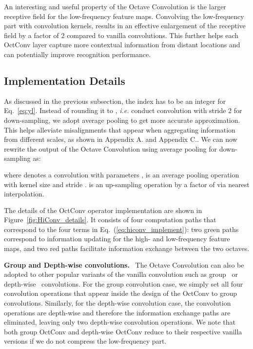\documentclass[10pt,twocolumn,letterpaper]{article}
\newcommand{\hiConv}[0]{OctConv\xspace}
\newcommand{\hiConvName}[0]{Octave Convolution\xspace}
\newcommand{\myparagraph}[1]{\vspace{1pt}\noindent\textbf{#1.}~}
\begin{document}
An interesting and useful property of the \hiConvName is the larger receptive field for the low-frequency feature maps. Convolving the low-frequency part  with  convolution kernels, results in an effective enlargement of the receptive field by a factor of 2 compared to vanilla convolutions. This further helps each \hiConv layer capture more contextual information from distant locations and can potentially improve recognition performance.


 

\subsection{Implementation Details}
\label{sec:implementation}


As discussed in the previous subsection, the index  has to be an integer for Eq.~\ref{eq:yl}. Instead of rounding it to , \emph{i.e.} conduct convolution with stride 2 for down-sampling, we adopt average pooling to get more accurate approximation. This helps alleviate misalignments that appear when aggregating information from different scales, as shown in Appendix A. and Appendix C.. We can now rewrite the output  of the \hiConvName using average pooling for down-sampling as:

where  denotes a convolution with parameters ,  is an average pooling operation with kernel size  and stride .  is an up-sampling operation by a factor of  via nearest interpolation. 

The details of the \hiConv operator implementation are shown in Figure~\ref{fig:HiConv_details}. It consists of four computation paths that correspond to the four terms in Eq.~(\ref{eq:hiconv_implement}): two green paths correspond to information updating for the high- and low-frequency feature maps, and two red paths facilitate information exchange between the two octaves. 


\myparagraph{Group and Depth-wise convolutions}
The \hiConvName can also be adopted to other popular variants of the vanilla convolution such as group~\cite{ResNeXt} or depth-wise~\cite{MobileNetV1} convolutions. For the group convolution case, we simply set all four convolution operations that appear inside the design of the \hiConv to group convolutions.
Similarly, for the depth-wise convolution case, the convolution operations are depth-wise and therefore the information exchange paths are eliminated, leaving only two depth-wise convolution operations. We note that both group \hiConv and depth-wise \hiConv reduce to their respective vanilla versions if we do not compress the low-frequency part.
\end{document}
